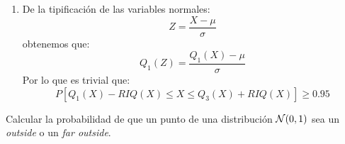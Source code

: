\begin{ejercicio}
\begin{enumerate}
            \noindent
            Consultamos el valor de $Q_1$ en la tabla de la normal $\cc{N}(0,1)$, buscamos el menor $x$ con $P[x\leq Z] \geq 0.25$, obteniendo aproximadamente $Q_1 = -0.68$. Ahora hemos de calcular $(3\cdot 0.68 = 2.04):$
            \begin{equation*}
                P[3Q_1 \leq Z] \approx P[-2.04 \leq Z] = P[Z\leq 2.04] \approx 0.9793 
            \end{equation*}
            Así, tenemos ahora que:
            \begin{align*}
                P[Q_1-RIQ\leq Z\leq Q_3+RIQ] &= 1 - 2\cdot P[Z\leq Q_1-RIQ] \\
                                             &= 1 - 2(1-P[Z\geq Q_1-RIQ]) \\
                                             &= -1 + 2P[Z\geq Q_1-RIQ] \\
                                             &\approx -1 + 2\cdot 0.9793 = 0.9586
            \end{align*}
        \item De la tipificación de las variables normales:
            \begin{equation*}
                Z = \frac{X-\mu}{\sigma}
            \end{equation*}
            obtenemos que:
            \begin{equation*}
                Q_1(Z) = \frac{Q_1(X)-\mu}{\sigma}
            \end{equation*}
            Por lo que es trivial que:
            \begin{equation*}
                P[Q_1(X)-RIQ(X)\leq X\leq Q_3(X)+RIQ(X)] \geq 0.95
            \end{equation*}
    \end{enumerate}
\end{ejercicio}

\begin{ejercicio}
    Calcular la probabilidad de que un punto de una distribución $\cc{N}(0,1)$ sea un \textit{outside} o un \textit{far outside}.\
\end{ejercicio}
